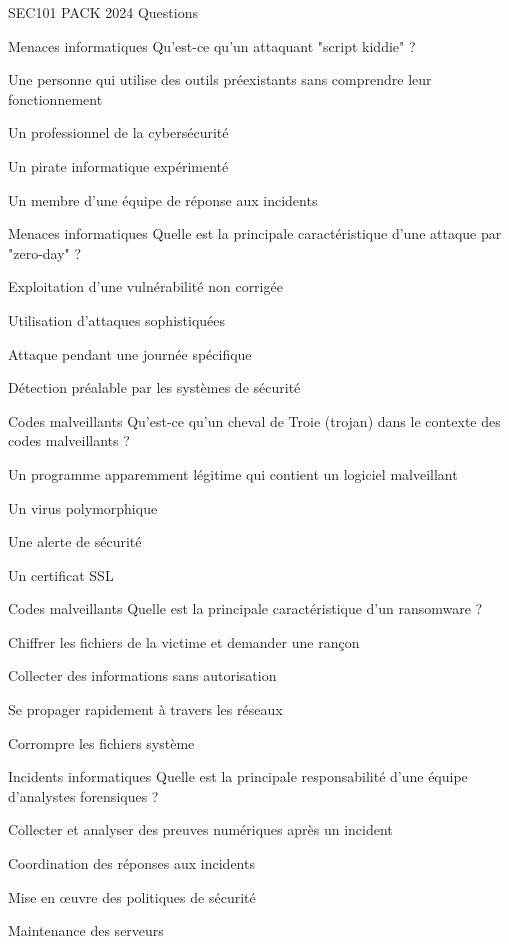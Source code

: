\documentclass[12pt]{article}
\begin{document}
\begin{quiz}{SEC101 PACK 2024 Questions}
\begin{multi}[points=1]{Menaces informatiques}
Qu'est-ce qu'un attaquant "script kiddie" ?
    \item *Une personne qui utilise des outils préexistants sans comprendre leur fonctionnement
    \item Un professionnel de la cybersécurité
    \item Un pirate informatique expérimenté
    \item Un membre d'une équipe de réponse aux incidents
\end{multi}

\begin{multi}[points=1]{Menaces informatiques}
Quelle est la principale caractéristique d'une attaque par "zero-day" ?
    \item *Exploitation d'une vulnérabilité non corrigée
    \item Utilisation d'attaques sophistiquées
    \item Attaque pendant une journée spécifique
    \item Détection préalable par les systèmes de sécurité
\end{multi}

\begin{multi}[points=1]{Codes malveillants}
Qu'est-ce qu'un cheval de Troie (trojan) dans le contexte des codes malveillants ?
    \item *Un programme apparemment légitime qui contient un logiciel malveillant
    \item Un virus polymorphique
    \item Une alerte de sécurité
    \item Un certificat SSL
\end{multi}

\begin{multi}[points=1]{Codes malveillants}
Quelle est la principale caractéristique d'un ransomware ?
    \item *Chiffrer les fichiers de la victime et demander une rançon
    \item Collecter des informations sans autorisation
    \item Se propager rapidement à travers les réseaux
    \item Corrompre les fichiers système
\end{multi}

\begin{multi}[points=1]{Incidents informatiques}
Quelle est la principale responsabilité d'une équipe d'analystes forensiques ?
    \item *Collecter et analyser des preuves numériques après un incident
    \item Coordination des réponses aux incidents
    \item Mise en œuvre des politiques de sécurité
    \item Maintenance des serveurs
\end{multi}


\end{quiz}
\end{document}
